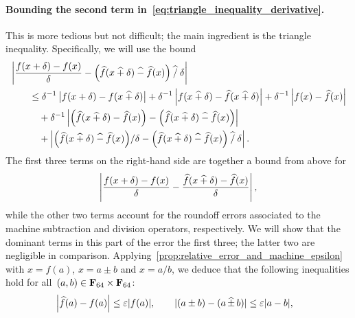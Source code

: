 \begin{solution}
    \paragraph{Bounding the second term in~\eqref{eq:triangle_inequality_derivative}.}
    This is more tedious but not difficult;
    the main ingredient is the triangle inequality.
    Specifically, we will use the bound
    \begin{align}
        \nonumber
        &\left\lvert \frac{f(x + \delta) - f(x)}{\delta} - \Bigl(\widehat f(x \mathbin{\widehat +} \delta) \mathbin{\widehat -} \widehat f(x)\Bigr) \mathbin{\widehat /} \delta \right\rvert \\
        \nonumber
        &\qquad \leq \delta^{-1}\left\lvert f(x+ \delta) - f(x\mathbin{\widehat +} \delta)  \right\rvert
         + \delta^{-1} \left\lvert f(x\mathbin{\widehat +} \delta) - \widehat f(x \mathbin{\widehat +} \delta)  \right\rvert
         + \delta^{-1} \left\lvert f(x) - \widehat f(x)  \right\rvert \\
        \nonumber
        &\qquad \quad + \delta^{-1} \left\lvert \Bigl(\widehat f(x \mathbin{\widehat +} \delta) - \widehat f(x)\Bigr) - \Bigl(\widehat f(x \mathbin{\widehat +} \delta) \mathbin{\widehat -} \widehat f(x)\Bigr) \right\rvert  \\
        \label{eq:numerical_differentiation_big_triangle}
        &\qquad \quad + \left\lvert \Bigl(\widehat f(x \mathbin{\widehat +} \delta) \mathbin{\widehat -} \widehat f(x)\Bigr) / \delta - \Bigl(\widehat f(x \mathbin{\widehat +} \delta) \mathbin{\widehat -} \widehat f(x)\Bigr) \mathbin{\widehat /} \delta \right\rvert.
    \end{align}
    The first three terms on the right-hand side are together a bound from above for 
    \begin{equation}
        \label{eq:bound_above_first_three_terms}
        \left\lvert \frac{f(x+\delta) - f(x) }{\delta} - \frac{ \widehat f(x\mathbin{\widehat +}\delta) - \widehat f(x) }{\delta} \right\rvert,
    \end{equation}
    while the other two terms account for the roundoff errors associated to the machine subtraction and division operators,
    respectively.
    We will show that the dominant terms in this part of the error the first three;
    the latter two are negligible in comparison.
    Applying~\cref{prop:relative_error_and_machine_epsilon} with $x = f(a)$,
    $x = a \pm b$ and $x = a/b$, 
    we deduce that the following inequalities hold for all~$(a, b) \in \mathbf F_{64} \times \mathbf F_{64}$:
    \begin{align}
        \label{eq:inequalities_numerical_differentiation}
        &\left\lvert \widehat f(a) - f(a) \right\rvert \leq \varepsilon \lvert f(a) \rvert,
        \qquad \lvert (a\pm b) - (a \, \widehat \pm\, b) \rvert \leq \varepsilon \abs{a-b},

\end{align}
\end{solution}
